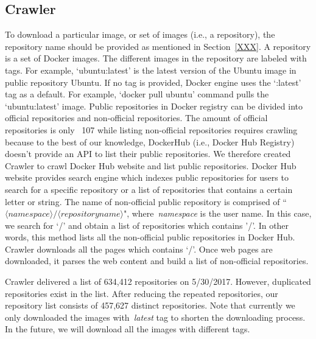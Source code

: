 %
\subsection{Crawler}
%
To download a particular image, or set of images (i.e., a repository), the
repository name should be provided as mentioned in Section~\ref{XXX}. 
%
A repository is a set of Docker images. The different images in the repository
are labeled with tags.
%
For example, `ubuntu:latest' is the latest version of the Ubuntu image in public
repository Ubuntu.
%
If no tag is provided, Docker engine uses the `:latest' tag as a default. For
example, `docker pull ubuntu' command pulls the `ubuntu:latest' image.
%
%
Public repositories in Docker registry can be divided into official repositories 
and non-official repositories.
%
%
The amount of official repositories is only ~107 while listing non-official
repositories requires crawling because to the best of our knowledge,
DockerHub (i.e., Docker Hub Registry) doesn't provide an API to list their public
repositories.
%
We therefore created Crawler to crawl Docker Hub website and list public repositories.
%
Docker Hub website provides search engine which indexes public repositories for
users to search for a specific repository or a list of repositories that contains
a certain letter or string. 
%
The name of non-official public repository is comprised
of ``$\langle namespace\rangle/\langle repository name \rangle $",
where~\textit{namespace} is the user name. 
%
In this case, we search for `/' and obtain a list of repositories which contains '/'.
%
In other words, this method lists all the non-official public repositories in Docker Hub.
%
Crawler downloads all the pages which contains `/'.
%
Once web pages are downloaded, it parses the web content and build a list of
non-official repositories. 



Crawler delivered a list of 634,412 repositories on 5/30/2017.
%
However, duplicated repositories exist in the list.
%
After reducing the repeated repositories, our repository list consists of 457,627
distinct repositories. 
%
Note that currently we only downloaded the images with~\textit{latest} tag to
shorten the downloading process. 
%
In the future, we will download all the images with different tags.
%
%
%

